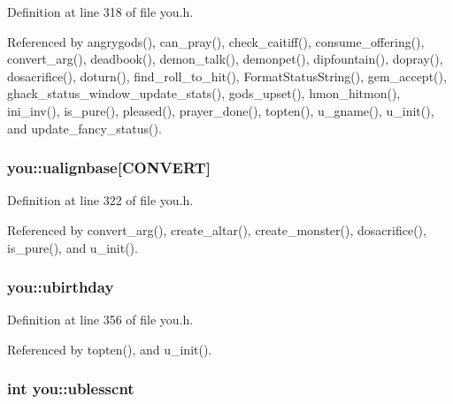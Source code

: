 Definition at line 318 of file you.\+h.



Referenced by angrygods(), can\+\_\+pray(), check\+\_\+caitiff(), consume\+\_\+offering(), convert\+\_\+arg(), deadbook(), demon\+\_\+talk(), demonpet(), dipfountain(), dopray(), dosacrifice(), doturn(), find\+\_\+roll\+\_\+to\+\_\+hit(), Format\+Status\+String(), gem\+\_\+accept(), ghack\+\_\+status\+\_\+window\+\_\+update\+\_\+stats(), gods\+\_\+upset(), hmon\+\_\+hitmon(), ini\+\_\+inv(), is\+\_\+pure(), pleased(), prayer\+\_\+done(), topten(), u\+\_\+gname(), u\+\_\+init(), and update\+\_\+fancy\+\_\+status().

\hypertarget{structyou_a842b4c48c384af3e9a8156009f8a82ac}{
\subsubsection[{ualignbase}]{ you\+::ualignbase\mbox{[}{\bf C\+O\+N\+V\+E\+R\+T}\mbox{]}}}\label{structyou_a842b4c48c384af3e9a8156009f8a82ac}


Definition at line 322 of file you.\+h.



Referenced by convert\+\_\+arg(), create\+\_\+altar(), create\+\_\+monster(), dosacrifice(), is\+\_\+pure(), and u\+\_\+init().

\hypertarget{structyou_a45b76395357b04e8d437260eb1d5f9f3}{
\subsubsection[{ubirthday}]{ you\+::ubirthday}}\label{structyou_a45b76395357b04e8d437260eb1d5f9f3}


Definition at line 356 of file you.\+h.



Referenced by topten(), and u\+\_\+init().

\hypertarget{structyou_a073894acd6109cd0c989708fd7c4d8c9}{
\subsubsection[{ublesscnt}]{\setlength{\rightskip}{0pt plus 5cm}int you\+::ublesscnt}}\label{structyou_a073894acd6109cd0c989708fd7c4d8c9}



